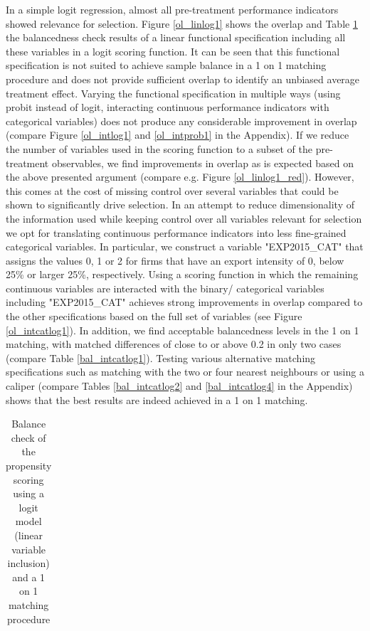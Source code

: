  In a simple logit regression, almost all pre-treatment performance indicators showed relevance for selection. Figure \ref{ol_linlog1} shows the overlap and Table \ref{bal_linlog1} the balancedness check results of a linear functional specification including all these variables in a logit scoring function. It can be seen that this functional specification is not suited to achieve sample balance in a 1 on 1 matching procedure and does not provide sufficient overlap to identify an unbiased average treatment effect. Varying the functional specification in multiple ways (using probit instead of logit, interacting continuous performance indicators with categorical variables) does not produce any considerable improvement in overlap (compare Figure \ref{ol_intlog1} and \ref{ol_intprob1} in the Appendix). If we reduce the number of variables used in the scoring function to a subset of the pre-treatment observables, we find improvements in overlap as is expected based on the above presented argument (compare e.g. Figure \ref{ol_linlog1_red}). However, this comes at the cost of missing control over several variables that could be shown to significantly drive selection. In an attempt to reduce dimensionality of the information used while keeping control over all variables relevant for selection we opt for translating continuous performance indicators into less fine-grained categorical variables. In particular, we construct a variable "EXP2015\_CAT" that assigns the values 0, 1 or 2 for firms that have an export intensity of 0, below 25\% or larger 25\%, respectively. Using a scoring function in which the remaining continuous variables are interacted with the binary/ categorical variables including "EXP2015\_CAT" achieves strong improvements in overlap compared to the other specifications based on the full set of variables (see Figure \ref{ol_intcatlog1}). In addition, we find acceptable balancedness levels in the 1 on 1 matching, with matched differences of close to or above 0.2 in only two cases (compare Table \ref{bal_intcatlog1}). Testing various alternative matching specifications such as matching with the two or four nearest neighbours or using a caliper (compare Tables \ref{bal_intcatlog2} and \ref{bal_intcatlog4} in the Appendix) shows that the best results are indeed achieved in a 1 on 1 matching. \\ \par

\begin{table}
	\centering
		\caption{Balance check of the propensity scoring using a logit model (linear variable inclusion) and a 1 on 1 matching procedure}
	\label{bal_linlog1}
\begin{tabular}{lcccc}
	\hline \hline
	
	\hline \hline
\end{tabular}
\end{table}

